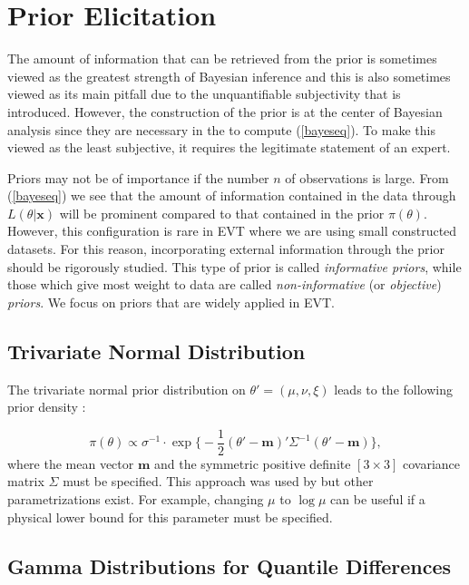 \section{Prior Elicitation}\label{sec:prior}


The amount of information that can be retrieved from the prior is sometimes viewed as the greatest strength of Bayesian inference and this is also sometimes viewed as its main pitfall due to the unquantifiable subjectivity that is introduced. However, the construction of the prior is at the center of Bayesian analysis since they are necessary in the to compute (\ref{bayeseq}). To make this viewed as the least subjective, it requires the legitimate statement of an expert.

Priors may not be of importance if the number $n$ of observations is large. From (\ref{bayeseq}) we see that the amount of information contained in the data through $L(\theta|\boldsymbol{x})$ will be prominent compared to that contained in the prior $\pi(\theta)$.
However, this configuration is rare in EVT where we are using small constructed datasets. For this reason, incorporating external information through the prior should be rigorously studied. This type of prior is called \emph{informative priors}, while those which give most weight to data are called \emph{non-informative} (or \emph{objective}) \emph{priors}. We focus on priors that are widely applied in EVT.




\subsection{Trivariate Normal Distribution}\label{sec:trivnorm}

The trivariate normal prior distribution on $\theta'=(\mu, \nu,\xi)$ leads to the following prior density :

\begin{equation}
\pi(\theta) \propto \sigma^{-1}\cdot \exp\bigg\{-\frac{1}{2}(\theta'-\boldsymbol{m})'\Sigma^{-1}(\theta'-\boldsymbol{m})\bigg\},
\end{equation}
where the mean vector $\boldsymbol{m}$ and the symmetric positive definite $[3\times 3]$ covariance matrix $\Sigma$ must be specified. This approach was used by \citet{coles_1996_bay} but other parametrizations exist. For example, changing $\mu$ to $\log \mu$ can be useful if a physical lower bound for this parameter must be specified.


\subsection{Gamma Distributions for Quantile Differences}

